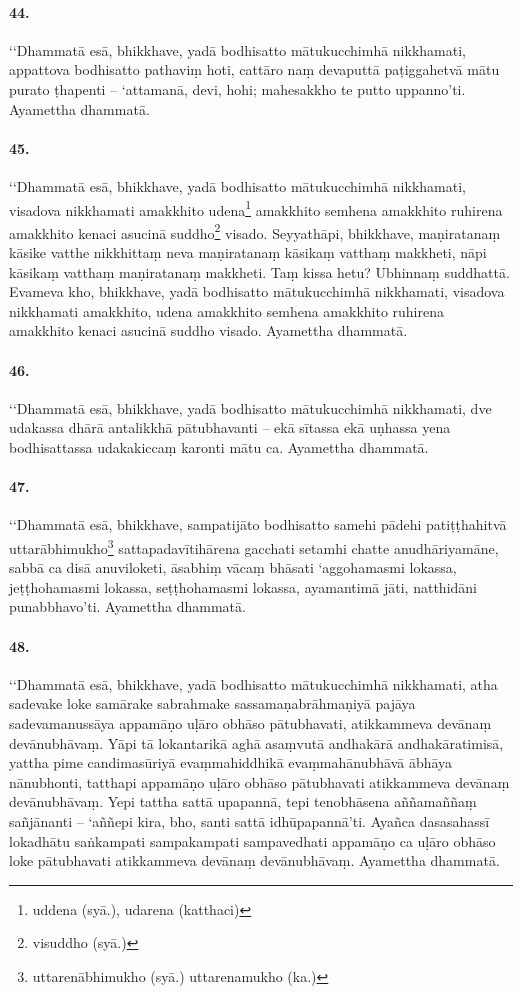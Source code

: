 \paragraph{44.} ‘‘Dhammatā esā, bhikkhave, yadā bodhisatto mātukucchimhā nikkhamati, appattova bodhisatto pathaviṃ hoti, cattāro naṃ devaputtā paṭiggahetvā mātu purato ṭhapenti – ‘attamanā, devi, hohi; mahesakkho te putto uppanno’ti. Ayamettha dhammatā.

\paragraph{45.} ‘‘Dhammatā esā, bhikkhave, yadā bodhisatto mātukucchimhā nikkhamati, visadova nikkhamati amakkhito udena\footnote{uddena (syā.), udarena (katthaci)} amakkhito semhena amakkhito ruhirena amakkhito kenaci asucinā suddho\footnote{visuddho (syā.)} visado. Seyyathāpi, bhikkhave, maṇiratanaṃ kāsike vatthe nikkhittaṃ neva maṇiratanaṃ kāsikaṃ vatthaṃ makkheti, nāpi kāsikaṃ vatthaṃ maṇiratanaṃ makkheti. Taṃ kissa hetu? Ubhinnaṃ suddhattā. Evameva kho, bhikkhave, yadā bodhisatto mātukucchimhā nikkhamati, visadova nikkhamati amakkhito, udena amakkhito semhena amakkhito ruhirena amakkhito kenaci asucinā suddho visado. Ayamettha dhammatā.

\paragraph{46.} ‘‘Dhammatā esā, bhikkhave, yadā bodhisatto mātukucchimhā nikkhamati, dve udakassa dhārā antalikkhā pātubhavanti – ekā sītassa ekā uṇhassa yena bodhisattassa udakakiccaṃ karonti mātu ca. Ayamettha dhammatā.

\paragraph{47.} ‘‘Dhammatā esā, bhikkhave, sampatijāto bodhisatto samehi pādehi patiṭṭhahitvā uttarābhimukho\footnote{uttarenābhimukho (syā.) uttarenamukho (ka.)} sattapadavītihārena gacchati setamhi chatte anudhāriyamāne, sabbā ca disā anuviloketi, āsabhiṃ vācaṃ bhāsati ‘aggohamasmi lokassa, jeṭṭhohamasmi lokassa, seṭṭhohamasmi lokassa, ayamantimā jāti, natthidāni punabbhavo’ti. Ayamettha dhammatā.

\paragraph{48.} ‘‘Dhammatā esā, bhikkhave, yadā bodhisatto mātukucchimhā nikkhamati, atha sadevake loke samārake sabrahmake sassamaṇabrāhmaṇiyā pajāya sadevamanussāya appamāṇo uḷāro obhāso pātubhavati, atikkammeva devānaṃ devānubhāvaṃ. Yāpi tā lokantarikā aghā asaṃvutā andhakārā andhakāratimisā, yattha pime candimasūriyā evaṃmahiddhikā evaṃmahānubhāvā ābhāya nānubhonti, tatthapi appamāṇo uḷāro obhāso pātubhavati atikkammeva devānaṃ devānubhāvaṃ. Yepi tattha sattā upapannā, tepi tenobhāsena aññamaññaṃ sañjānanti – ‘aññepi kira, bho, santi sattā idhūpapannā’ti. Ayañca dasasahassī lokadhātu saṅkampati sampakampati sampavedhati appamāṇo ca uḷāro obhāso loke pātubhavati atikkammeva devānaṃ devānubhāvaṃ. Ayamettha dhammatā.

